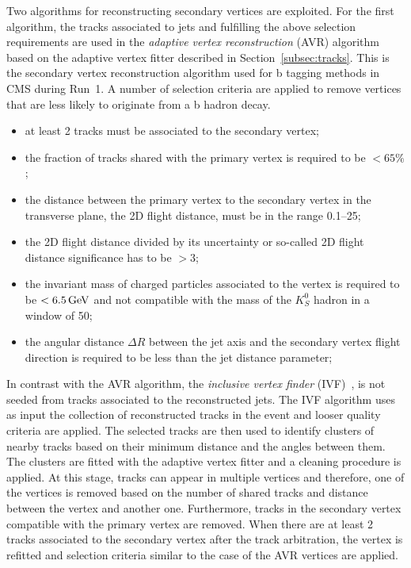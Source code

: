 Two algorithms for reconstructing secondary vertices are exploited. For the first algorithm, the tracks associated to jets and fulfilling the above selection requirements are used in the {\itshape adaptive vertex reconstruction} (AVR) algorithm~\cite{Waltenberger:1166320} based on the adaptive vertex fitter described in Section~\ref{subsec:tracks}. This is the secondary vertex reconstruction algorithm used for b tagging methods in CMS during Run~1. A number of selection criteria are applied to remove vertices that are less likely to originate from a b hadron decay. 

\begin{itemize}
\item at least 2 tracks must be associated to the secondary vertex;
\item the fraction of tracks shared with the primary vertex is required to be $< 65\%$;
\item the distance between the primary vertex to the secondary vertex in the transverse plane, the 2D flight distance, must be in the range 0.1--25\mm;
\item the 2D flight distance divided by its uncertainty or so-called 2D flight distance significance has to be $> 3$;
\item the invariant mass of charged particles associated to the vertex is required to be $< 6.5\,\text{Ge\hspace{-.08em}V}$ and not compatible with the mass of the $K^0_S$ hadron in a window of 50\MeV;
\item the angular distance $\Delta R$ between the jet axis and the secondary vertex flight direction is required to be less than the jet distance parameter;
\end{itemize}

In contrast with the AVR algorithm, the {\itshape inclusive vertex finder} (IVF)~\cite{Khachatryan:2011wq}, is not seeded from tracks associated to the reconstructed jets. The IVF algorithm uses as input the collection of reconstructed tracks in the event and looser quality criteria are applied. The selected tracks are then used to identify clusters of nearby tracks based on their minimum distance and the angles between them. The clusters are fitted with the adaptive vertex fitter and a cleaning procedure is applied. At this stage, tracks can appear in multiple vertices and therefore, one of the vertices is removed based on the number of shared tracks and distance between the vertex and another one. Furthermore, tracks in the secondary vertex compatible with the primary vertex are removed. When there are at least 2 tracks associated to the secondary vertex after the track arbitration, the vertex is refitted and selection criteria similar to the case of the AVR vertices are applied.


